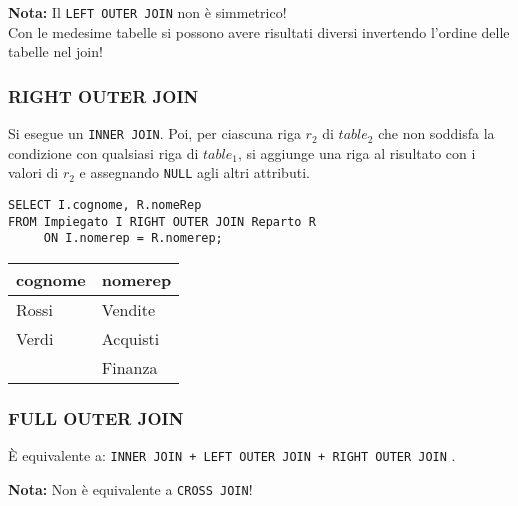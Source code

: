 \documentclass[a4paper, 10pt, titlepage]{article}
\begin{document}
			\noindent
			\textbf{Nota: } Il \lstinline|LEFT OUTER JOIN| non è simmetrico! \\
			Con le medesime tabelle si possono avere risultati diversi invertendo l’ordine
			delle tabelle nel join!
		\subsubsection*{RIGHT OUTER JOIN}
			Si esegue un \lstinline|INNER JOIN|. Poi, per ciascuna riga $ r_2 $ di $ table_2 $ che non
			soddisfa la condizione con qualsiasi riga di $ table_1 $, si aggiunge una riga al
			risultato con i valori di $ r_2 $ e assegnando \lstinline|NULL| agli altri attributi.
			
			\bigskip
			\noindent
			\begin{minipage}{0.67\textwidth}
					\begin{lstlisting}
SELECT I.cognome, R.nomeRep
FROM Impiegato I RIGHT OUTER JOIN Reparto R 
     ON I.nomerep = R.nomerep;
					\end{lstlisting}
				\end{minipage}\hfilneg\vrule\hfill
			\begin{minipage}{.28\textwidth}
					\begin{tabular}{ll}
							\toprule
							\textbf{cognome} & \textbf{nomerep} \\
							\midrule
							Rossi & Vendite \\
							Verdi & Acquisti \\
							& Finanza \\
							\midrule
						\end{tabular}
					\end{minipage}
	
		\subsubsection*{FULL OUTER JOIN}
			È equivalente a: \lstinline|INNER JOIN + LEFT OUTER JOIN + RIGHT OUTER JOIN| .
			
			\noindent
			\textbf{Nota: }Non è equivalente a \lstinline|CROSS JOIN|!
			
\end{document}
